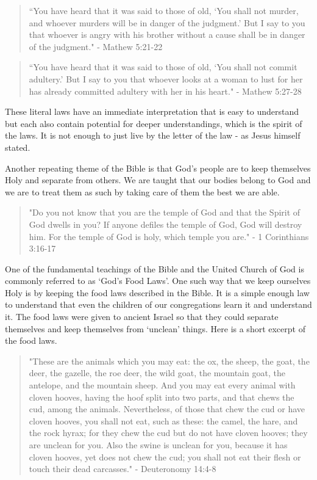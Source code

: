 \documentclass[10pt]{article}
\begin{document}
\begin{multicols}{2}
\begin{quotation}
	``You have heard that it was said to those of old, `You shall not murder, and whoever murders will be in danger of the judgment.' But I say to you that whoever is angry with his brother without a cause shall be in danger of the judgment." - Mathew 5:21-22
\end{quotation}

\begin{quotation}
	``You have heard that it was said to those of old, `You shall not commit adultery.’ But I say to you that whoever looks at a woman to lust for her has already committed adultery with her in his heart." - Mathew 5:27-28
\end{quotation}

These literal laws have an immediate interpretation that is easy to understand but each also contain potential for deeper understandings, which is the spirit of the laws. It is not enough to just live by the letter of the law - as Jesus himself stated. 

Another repeating theme of the Bible is that God's people are to keep themselves Holy and separate from others. We are taught that our bodies belong to God and we are to treat them as such by taking care of them the best we are able. 

\begin{quotation}
	"Do you not know that you are the temple of God and that the Spirit of God dwells in you? If anyone defiles the temple of God, God will destroy him. For the temple of God is holy, which temple you are." - 1 Corinthians 3:16-17
\end{quotation}

One of the fundamental teachings of the Bible and the United Church of God is commonly referred to as `God's Food Laws'. One such way that we keep ourselves Holy is by keeping the food laws described in the Bible. It is a simple enough law to understand that even the children of our congregations learn it and understand it. The food laws were given to ancient Israel so that they could separate themselves and keep themselves from `unclean' things. Here is a short excerpt of the food laws.

\begin{quotation}
	"These are the animals which you may eat: the ox, the sheep, the goat, the deer, the gazelle, the roe deer, the wild goat, the mountain goat, the antelope, and the mountain sheep. And you may eat every animal with cloven hooves, having the hoof split into two parts, and that chews the cud, among the animals. Nevertheless, of those that chew the cud or have cloven hooves, you shall not eat, such as these: the camel, the hare, and the rock hyrax; for they chew the cud but do not have cloven hooves; they are unclean for you. Also the swine is unclean for you, because it has cloven hooves, yet does not chew the cud; you shall not eat their flesh or touch their dead carcasses." - Deuteronomy 14:4-8
\end{quotation}


\end{multicols}
\end{document}
